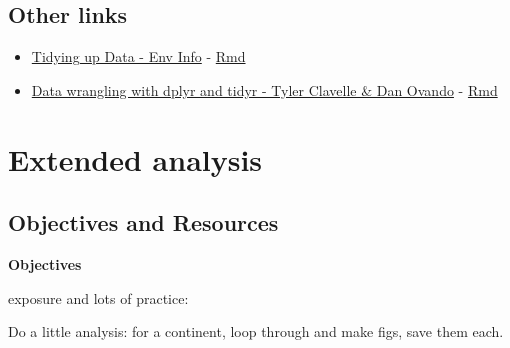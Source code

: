 \documentclass[]{book}
\providecommand{\tightlist}{%
  \setlength{\itemsep}{0pt}\setlength{\parskip}{0pt}}
\theoremstyle{definition}
\theoremstyle{definition}
\theoremstyle{definition}
\theoremstyle{remark}
\begin{document}
\section{Other links}\label{other-links}

\begin{itemize}
\tightlist
\item
  \href{http://ucsb-bren.github.io/env-info/wk04_tidyr.html}{Tidying up
  Data - Env Info} -
  \href{https://github.com/ucsb-bren/env-info/blob/gh-pages/wk04_tidyr.Rmd}{Rmd}
\item
  \href{http://bbest.github.io/dplyr-tidyr-tutorial/}{Data wrangling
  with dplyr and tidyr - Tyler Clavelle \& Dan Ovando} -
  \href{https://github.com/bbest/dplyr-tidyr-tutorial/blob/gh-pages/index.Rmd}{Rmd}
\end{itemize}

\chapter{Extended analysis}\label{analysis}

\section{Objectives and Resources}\label{objectives-and-resources}

\textbf{Objectives}

exposure and lots of practice:

Do a little analysis: for a continent, loop through and make figs, save
them each.
\end{document}
